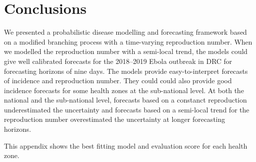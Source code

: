 \documentclass[12pt]{article}
\begin{document}
\section{Conclusions}
We presented a probabilistic disease modelling and forecasting framework based on a modified branching process with a time-varying reproduction number. When we modelled the reproduction number with a semi-local trend, the models could give well calibrated forecasts for the 2018--2019 Ebola outbreak in DRC for forecasting horizons of nine days. The models provide easy-to-interpret forecasts of incidence and reproduction number. They could could also provide good incidence forecasts for some health zones at the sub-national level. At both the national and the sub-national level, forecasts based on a constanct reproduction underestimated the uncertainty and forecasts based on a semi-local trend for the reproduction number overestimated the uncertainty at longer forecasting horizons. 


\newpage

 


\clearpage
\newpage

\appendix
\appendixpage
\addappheadtotoc
{}
This appendix shows the best fitting model and evaluation score for each health zone.


\end{document}
